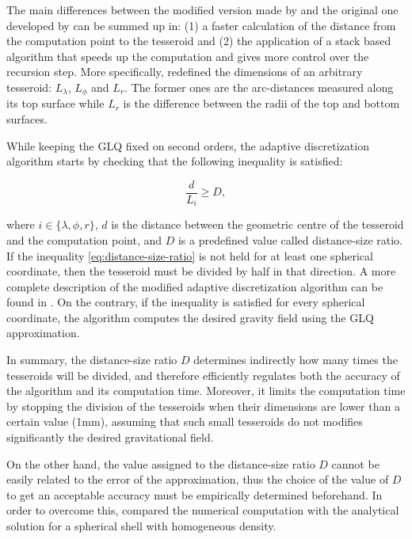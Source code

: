\documentclass[extra]{gji}
\begin{document}
The main differences between the modified version made by \citet{Uieda2016} and the original one developed by \citet{Li2011} can be summed up in:
(1) a faster calculation of the distance from the computation point to the tesseroid and 
(2) the application of a stack based algorithm that speeds up the computation and gives more control over the recursion step.
More specifically, \citet{Uieda2016} redefined the dimensions of an arbitrary tesseroid: $L_\lambda$, $L_\phi$ and $L_r$. The former ones are the arc-distances measured along its top surface while $L_r$ is the difference between the radii of the top and bottom surfaces.

While keeping the GLQ fixed on second orders, the adaptive discretization algorithm starts by checking that the following inequality is satisfied:

\begin{equation}
    \frac{d}{L_i} \geq D,
\label{eq:distance-size-ratio}
\end{equation}

\noindent where $i \in \{\lambda, \phi, r\}$, $d$ is the distance between the geometric centre of the tesseroid and the computation point, and $D$ is a predefined value called distance-size ratio.
If the inequality \ref{eq:distance-size-ratio} is not held for at least one spherical coordinate, then the tesseroid must be divided by half in that direction.
A more complete description of the modified adaptive discretization algorithm can be found in \citet{Uieda2016}.
On the contrary, if the inequality is satisfied for every spherical coordinate, the algorithm computes the desired gravity field using the GLQ approximation.

In summary, the distance-size ratio $D$ determines indirectly how many times the tesseroids will be divided, and therefore efficiently regulates both the accuracy of the algorithm and its computation time.
Moreover, it limits the computation time by stopping the division of the tesseroids when their dimensions are lower than a certain value (1mm), assuming that such small tesseroids do not modifies significantly the desired gravitational field.

On the other hand, the value assigned to the distance-size ratio $D$ cannot be easily related to the error of the approximation, thus the choice of the value of $D$ to get an acceptable accuracy must be empirically determined beforehand.
In order to overcome this, \citet{Uieda2016} compared the numerical computation with the analytical solution for a spherical shell with homogeneous density.
\end{document}
